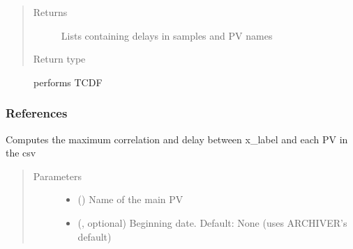 \documentclass[letterpaper,10pt,english]{sphinxmanual}
\begin{document}
\begin{fulllineitems}
\begin{fulllineitems}
\begin{quote}
\begin{description}
\item[{Returns}] \leavevmode
\sphinxAtStartPar
Lists containing delays in samples and PV names

\item[{Return type}] \leavevmode
\sphinxAtStartPar
{}

\end{description}\end{quote}


\nopagebreak

\begin{description}
\item[{}] \leavevmode
\sphinxAtStartPar
performs TCDF

\end{description}


\subsubsection*{References}

\end{fulllineitems}


\begin{fulllineitems}
\label{\detokenize{dataset:dataset.Dataset.correlate}}
\sphinxAtStartPar
Computes the maximum correlation and delay between x\_label and each PV in the csv
\begin{quote}\begin{description}
\item[{Parameters}] \leavevmode\begin{itemize}
\item {} 
\sphinxAtStartPar
{} () \textendash{} Name of the main PV

\item {} 
\sphinxAtStartPar
{} (, optional) \textendash{} Beginning date. Default: None (uses ARCHIVER’s default)


\end{itemize}
\end{description}
\end{quote}
\end{fulllineitems}
\end{fulllineitems}
\end{document}
